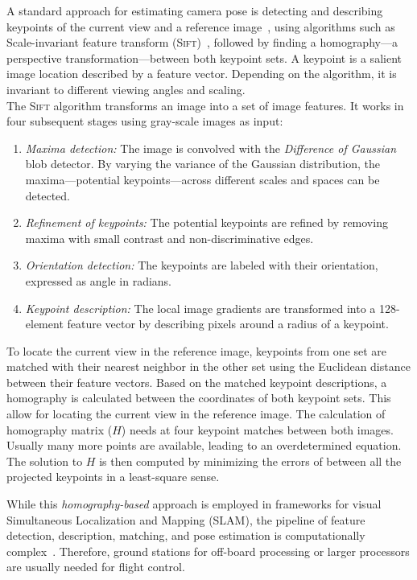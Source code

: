 \documentclass{report}
\begin{document}
A standard approach for estimating camera pose is detecting and
describing keypoints of the current view and a reference
image~\cite{se2002global}, using algorithms such as Scale-invariant
feature transform (\textsc{Sift})~\cite{lowe1999object}, followed by
finding a homography---a perspective transformation---between both
keypoint sets. A keypoint is a salient image location described by a
feature vector. Depending on the algorithm, it is
invariant to different viewing angles and scaling.\\
The \textsc{Sift} algorithm transforms an image into a set of image
features. It works in four subsequent stages using gray-scale images
as input:
\begin{enumerate}
\item \emph{Maxima detection:} The image is convolved with the
  \emph{Difference of Gaussian} blob detector. By varying the variance
  of the Gaussian distribution, the maxima---potential
  keypoints---across different scales and spaces can be detected.
\item \emph{Refinement of keypoints:} The potential keypoints are
  refined by removing maxima with small contrast and non-discriminative
  edges.
\item \emph{Orientation detection:} The keypoints are labeled with
  their orientation, expressed as angle in radians.
\item \emph{Keypoint description:} The local image gradients are
  transformed into a 128-element feature vector by describing pixels
  around a radius of a keypoint.
\end{enumerate}

To locate the current view in the reference image, keypoints from one
set are matched with their nearest neighbor in the other set using the
Euclidean distance between their feature vectors. Based on the matched
keypoint descriptions, a homography is calculated between the
coordinates of both keypoint sets. This allow for locating the current
view in the reference image. The calculation of homography matrix
($H$) needs at four keypoint matches between both images. Usually many
more points are available, leading to an overdetermined equation. The
solution to $H$ is then computed by minimizing the errors of between
all the projected keypoints in a least-square sense.

While this \emph{homography-based} approach is employed in frameworks
for visual Simultaneous Localization and Mapping (SLAM), the pipeline
of feature detection, description, matching, and pose estimation is
computationally complex~\cite{kendall2015posenet}. Therefore, ground
stations for off-board processing or larger processors are usually
needed for flight control.
\end{document}
